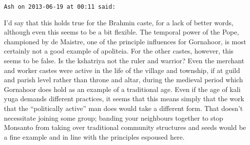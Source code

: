 \begin{footnotesize}
\begin{sffamily}
\hfill

\texttt{Ash on 2013-06-19 at 00:11 said:}

I'd say that this holds true for the Brahmin caste, for a lack of better words, although even this seems to be a bit flexible. The temporal power of the Pope, championed by de Maistre, one of the principle influences for Gornahoor, is most certainly not a good example of apoliteia. For the other castes, however, this seems to be false. Is the kshatriya not the ruler and warrior? Even the merchant and worker castes were active in the life of the village and township, if at guild and parish level rather than throne and altar, during the medieval period which Gornahoor does hold as an example of a traditional age. Even if the age of kali yuga demands different practices, it seems that this means simply that the work that the ``politically active'' man does would take a different form. That doesn't necessitate joining some group; banding your neighbours together to stop Monsanto from taking over traditional community structures and seeds would be a fine example and in line with the principles espoused here.

\hfill

\end{sffamily}
\end{footnotesize}

